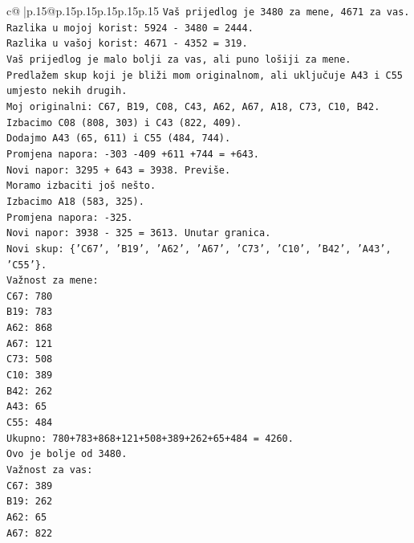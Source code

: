 \documentclass{article}
\begin{document}
{\begin{supertabular}{c@{$\;$}|p{.15\linewidth}@{}p{.15\linewidth}p{.15\linewidth}p{.15\linewidth}p{.15\linewidth}p{.15\linewidth}}
{{{\texttt{Vaš prijedlog je 3480 za mene, 4671 za vas.} \\
\texttt{Razlika u mojoj korist: 5924 {-} 3480 = 2444.} \\
\texttt{Razlika u vašoj korist: 4671 {-} 4352 = 319.} \\
\texttt{Vaš prijedlog je malo bolji za vas, ali puno lošiji za mene.} \\
\texttt{Predlažem skup koji je bliži mom originalnom, ali uključuje A43 i C55 umjesto nekih drugih.} \\
\texttt{Moj originalni: C67, B19, C08, C43, A62, A67, A18, C73, C10, B42.} \\
\texttt{Izbacimo C08 (808, 303) i C43 (822, 409).} \\
\texttt{Dodajmo A43 (65, 611) i C55 (484, 744).} \\
\texttt{Promjena napora: {-}303 {-}409 +611 +744 = +643.} \\
\texttt{Novi napor: 3295 + 643 = 3938. Previše.} \\
\texttt{Moramo izbaciti još nešto.} \\
\texttt{Izbacimo A18 (583, 325).} \\
\texttt{Promjena napora: {-}325.} \\
\texttt{Novi napor: 3938 {-} 325 = 3613. Unutar granica.} \\
\texttt{Novi skup: \{'C67', 'B19', 'A62', 'A67', 'C73', 'C10', 'B42', 'A43', 'C55'\}.} \\
\texttt{Važnost za mene:} \\
\texttt{C67: 780} \\
\texttt{B19: 783} \\
\texttt{A62: 868} \\
\texttt{A67: 121} \\
\texttt{C73: 508} \\
\texttt{C10: 389} \\
\texttt{B42: 262} \\
\texttt{A43: 65} \\
\texttt{C55: 484} \\
\texttt{Ukupno: 780+783+868+121+508+389+262+65+484 = 4260.} \\
\texttt{Ovo je bolje od 3480.} \\
\texttt{Važnost za vas:} \\
\texttt{C67: 389} \\
\texttt{B19: 262} \\
\texttt{A62: 65} \\
\texttt{A67: 822} \\
}}}
\end{supertabular}}
\end{document}
